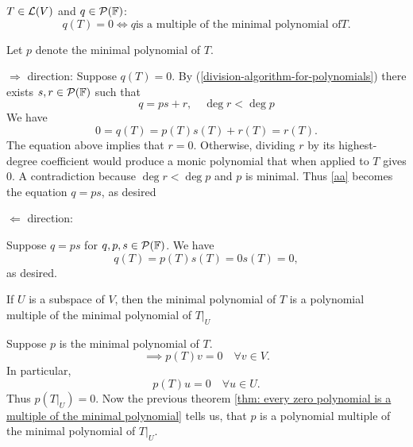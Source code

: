 \setcounter{thm}{28}
\begin{thm}
  \label{thm: every zero polynomial is a multiple of the minimal polynomial}
  $T\in \mathcal{L}(V)$ and $q \in \mathcal{P} (\mathbb{F})$: 
  \begin{equation}
    q(T)=0 \iff q \text{is a multiple of the minimal polynomial of} T.
  \end{equation}
\end{thm}
\begin{prf}
  Let $p$ denote the minimal polynomial of $T$.

	\begin{description}
  
  \item{$\Rightarrow$ direction:}{
			Suppose $q(T)=0$.
			By (\ref{division-algorithm-for-polynomials}) there exists $s,r \in \mathcal{P} (\mathbb{F})$ such that
			\begin{equation}
				q=ps+r, \quad \deg r < \deg p
			\end{equation}
			We have
			\begin{equation}
				\label{aa}
				0 = q(T) = p(T)s(T) + r(T) = r(T).
			\end{equation}
			The equation above implies that $r=0$. Otherwise, dividing $r$ by its highest-degree coefficient would produce a monic polynomial that when applied to $T$ gives $0$. A contradiction because $\deg r < \deg p$ and $p$ is minimal. Thus \ref{aa} becomes the equation $q=ps$, as desired
		}
		\item{$\Leftarrow$ direction:}{
			Suppose $q=ps$ for $q,p,s \in \mathcal{P}(\mathbb{F})$. We have
			\begin{equation}
				q(T) = p(T)s(T)=0s(T)=0,
			\end{equation}
			as desired. 
      
		}
	\end{description}
  
\end{prf}

\setcounter{thm}{30}
\begin{thm}
  \label{thm: minimal polynomial of a restriction operator}
  If $U$ is a subspace of $V$, then the minimal polynomial of $T$ is a polynomial multiple of the minimal polynomial of $\left .T \right | _{ U}$
\end{thm}
\begin{prf}
  Suppose $p$ is the minimal polynomial of $T$.
  \begin{equation}
    \implies p(T)v=0 \quad \forall v \in V.
  \end{equation}
  In particular,
  \begin{equation}
    p(T)u=0 \quad \forall u\in U.
  \end{equation} Thus $p\left( \left.T\right|_{U} \right)=0.$ Now the previous theorem
  \autoref{thm: every zero polynomial is a multiple of the minimal polynomial} tells us, that $p$ is a polynomial multiple of the minimal polynomial of $\left. T \right |_U$.
  
\end{prf}


